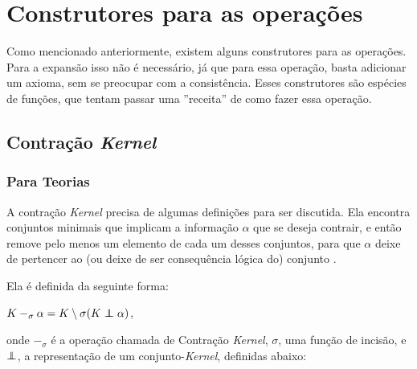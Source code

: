 \section{Construtores para as operações}

Como mencionado anteriormente, existem alguns construtores para as operações. Para a expansão isso não é necessário, já que para essa operação, basta adicionar um axioma, sem se preocupar com a consistência. Esses construtores são espécies de funções, que tentam passar uma ''receita'' de como fazer essa operação. 

\subsection{Contração \textit{Kernel}}

\subsubsection{Para Teorias}

A contração \textit{Kernel} precisa de algumas definições para ser discutida. Ela encontra conjuntos minimais que implicam a informação $ \alpha $ que se deseja contrair, e então remove pelo menos um elemento de cada um desses conjuntos, para que $ \alpha $ deixe de pertencer ao (ou deixe de ser consequência lógica do) conjunto \citep{revisaoCobe}. 

Ela é definida da seguinte forma:

\begin{center}
	$ K -_{\sigma} \alpha = K \setminus \sigma(K \kcont \alpha) $,
\end{center}

onde $ -_{\sigma} $ é a operação chamada de Contração \textit{Kernel}, $ \sigma $, uma função de incisão, e $ \kcont $, a representação de um conjunto-\textit{Kernel}, definidas abaixo:

